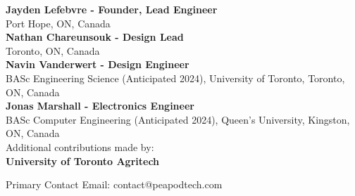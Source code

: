 \small{
    \textbf{Jayden Lefebvre - Founder, Lead Engineer}\\
    Port Hope, ON, Canada\\
    \vspace{.5cm}
    \textbf{Nathan Chareunsouk - Design Lead}\\Toronto, ON, Canada\\
    \vspace{.5cm}
    \textbf{Navin Vanderwert - Design Engineer}\\
    BASc Engineering Science (Anticipated 2024), University of Toronto, Toronto, ON, Canada\\
    \vspace{.5cm}
    \textbf{Jonas Marshall - Electronics Engineer}\\
    BASc Computer Engineering (Anticipated 2024), Queen's University, Kingston, ON, Canada\\
    \vspace{.5cm}
    Additional contributions made by:\\
    \textbf{University of Toronto Agritech}
}

\vspace{1cm}

Primary Contact Email: contact@peapodtech.com